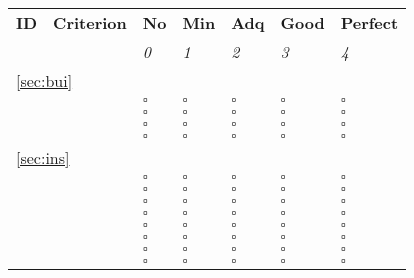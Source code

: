 \documentclass[a4paper,11pt]{article}
\begin{document}
\begin{table}[hbt]
	\begin{tabular}
		{ p{} | 
		  p{} |
		  p{} |
		  p{} |
		  p{} |
		  p{} |
		  p{} }
		\hline
		\textbf{ID} & \textbf{Criterion} & \textbf{No} & \textbf{Min} & \textbf{Adq} & \textbf{Good} & \textbf{Perfect} \\
                                        & & \emph{0} & \emph{1} & \emph{2} & \emph{3} & \emph{4} \\
        \hline
        \multicolumn{7}{l}{\ref{sec:bui}{ }\nameref{sec:bui}} \\
		\hline
		\hyperref[id:B1]{\bOneID} & \bOneText & $\square$ & $\square$ & $\square$ & $\square$ & $\square$ \\
		\hyperref[id:B2]{\bTwoID} & \bTwoText & $\square$ & $\square$ & $\square$ & $\square$ & $\square$ \\
		\hyperref[id:B3]{\bThreeID} & \bThreeText & $\square$ & $\square$ & $\square$ & $\square$ & $\square$ \\
		\hyperref[id:B4]{\bFourID} & \bFourText & $\square$ & $\square$ & $\square$ & $\square$ & $\square$ \\
		\hline			
		\multicolumn{7}{l}{\ref{sec:ins}{ }\nameref{sec:ins}} \\
		\hline
		\hyperref[id:IS1]{\isOneID} & \isOneText & $\square$ & $\square$ & $\square$ & $\square$ & $\square$ \\
		\hyperref[id:IS2]{\isTwoID} & \isTwoText & $\square$ & $\square$ & $\square$ & $\square$ & $\square$ \\
		\hyperref[id:IS3]{\isThreeID} & \isThreeText & $\square$ & $\square$ & $\square$ & $\square$ & $\square$ \\
		\hyperref[id:IS4]{\isFourID} & \isFourText & $\square$ & $\square$ & $\square$ & $\square$ & $\square$ \\
		\hyperref[id:IS5]{\isFiveID} & \isFiveText & $\square$ & $\square$ & $\square$ & $\square$ & $\square$ \\
		\hyperref[id:IS6]{\isSixID} & \isSixText & $\square$ & $\square$ & $\square$ & $\square$ & $\square$ \\
		\hyperref[id:IS7]{\isSevenID} & \isSevenText & $\square$ & $\square$ & $\square$ & $\square$ & $\square$ \\
		\hyperref[id:IS8]{\isEightID} & \isEightText & $\square$ & $\square$ & $\square$ & $\square$ & $\square$ \\

\end{tabular}
\end{table}
\end{document}
